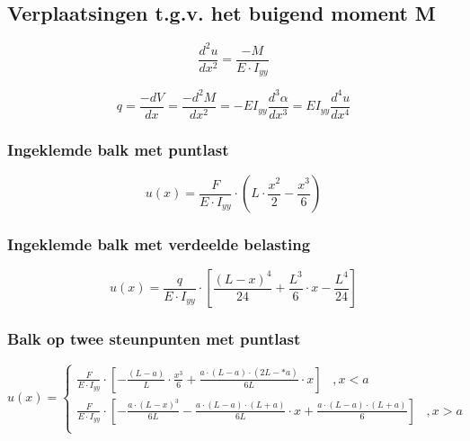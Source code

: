         \subsection{Verplaatsingen t.g.v. het buigend moment M}

            \begin{equation}
                \frac{d^2u}{dx^2} = \frac{-M}{E\cdot I_{yy}}
            \end{equation}

            \begin{equation}
                q = \frac{-dV}{dx} = \frac{-d^2M}{dx^2} = -EI_{yy}\frac{d^3\alpha}{dx^3} = EI_{yy}\frac{d^4u}{dx^4}
            \end{equation}

            \subsubsection{Ingeklemde balk met puntlast}

                \begin{equation}
                    u(x) = \frac{F}{E\cdot I_{yy}}\cdot\left(L\cdot\frac{x^2}{2}-\frac{x^3}{6}\right)
                \end{equation}

            \subsubsection{Ingeklemde balk met verdeelde belasting}

                \begin{equation}
                    u(x) = \frac{q}{E\cdot I_{yy}}\cdot\left[\frac{(L-x)^4}{24}+\frac{L^3}{6}\cdot x-\frac{L^4}{24}\right]
                \end{equation}

            \subsubsection{Balk op twee steunpunten met puntlast}

                \begin{equation}
                    u(x) = \left\lbrace\begin{matrix}
                        \frac{F}{E\cdot I_{yy}}\cdot\left[-\frac{(L-a)}{L}\cdot\frac{x^3}{6}+\frac{a\cdot (L-a)\cdot(2L-*a)}{6L}\cdot x\right]\;\;\; , x < a\\
                        \frac{F}{E\cdot I_{yy}}\cdot\left[-\frac{a\cdot(L-x)^3}{6L}-\frac{a\cdot(L-a)\cdot(L+a)}{6L}\cdot x + \frac{a\cdot (L-a)\cdot (L+a)}{6}\right]\;\;\; , x > a\\
                    \end{matrix}\right.
                \end{equation}

